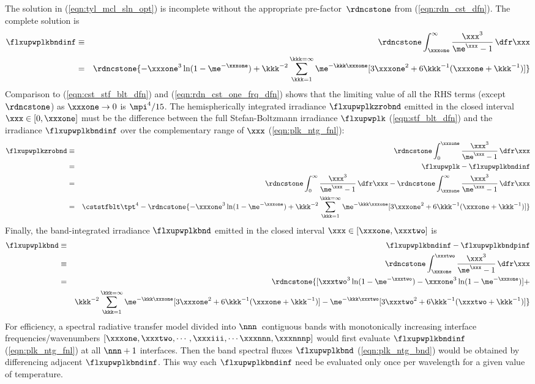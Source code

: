 \documentclass[12pt]{article}
\begin{document}
The solution in (\ref{eqn:tyl_mcl_sln_opt}) is incomplete without the appropriate pre-factor~$\rdncstone$ from (\ref{eqn:rdn_cst_dfn}).
The complete solution is
\begin{eqnarray}
\label{eqn:plk_ntg_fnl}
\flxupwplkbndinf
& \equiv & \rdncstone
\int_{\xxxone}^{\infty} 
\frac{\xxx^{3}}{\me^{\xxx} - 1} \,\dfr\xxx \nonumber \\
& = & \rdncstone \{
-\xxxone^{3}\ln(1 - \me^{-\xxxone}) + 
\kkk^{-2}\sum_{\kkk=1}^{\kkk=\infty} \me^{-\kkk\xxxone}[3\xxxone^{2} + 6\kkk^{-1}(\xxxone + \kkk^{-1})] \}
\end{eqnarray}
Comparison to (\ref{eqn:cst_stf_blt_dfn}) and (\ref{eqn:rdn_cst_one_frq_dfn}) shows that the limiting value of all the RHS terms (except $\rdncstone$) as $\xxxone \rightarrow 0$ is $\mpi^{4}/15$.
The hemispherically integrated irradiance $\flxupwplkzrobnd$ emitted
in the closed interval $\xxx \in [0,\xxxone]$ must be the difference
between the full Stefan-Boltzmann irradiance $\flxupwplk$
(\ref{eqn:stf_blt_dfn}) and the irradiance $\flxupwplkbndinf$ over the
complementary range of $\xxx$ (\ref{eqn:plk_ntg_fnl}): 
\begin{eqnarray}
\label{eqn:plk_ntg_cmp}
\flxupwplkzrobnd
& \equiv & \rdncstone
\int_{0}^{\xxxone} 
\frac{\xxx^{3}}{\me^{\xxx} - 1} \,\dfr\xxx \nonumber \\
& = & \flxupwplk - \flxupwplkbndinf \nonumber \\
& = & \rdncstone
\int_{0}^{\infty} 
\frac{\xxx^{3}}{\me^{\xxx} - 1} \,\dfr\xxx -
\rdncstone
\int_{\xxxone}^{\infty} 
\frac{\xxx^{3}}{\me^{\xxx} - 1} \,\dfr\xxx \nonumber \\
& = & \cststfblt \tpt^{4} - \rdncstone \{
-\xxxone^{3}\ln(1 - \me^{-\xxxone}) + 
\kkk^{-2}\sum_{\kkk=1}^{\kkk=\infty} \me^{-\kkk\xxxone}[3\xxxone^{2} + 6\kkk^{-1}(\xxxone + \kkk^{-1})] \}
\end{eqnarray}
Finally, the band-integrated irradiance $\flxupwplkbnd$ emitted
in the closed interval $\xxx \in [\xxxone,\xxxtwo]$ is
\begin{eqnarray}
\label{eqn:plk_ntg_bnd}
\flxupwplkbnd
& \equiv & \flxupwplkbndinf - \flxupwplkbndpinf \nonumber \\
& \equiv & \rdncstone
\int_{\xxxone}^{\xxxtwo} 
\frac{\xxx^{3}}{\me^{\xxx} - 1} \,\dfr\xxx \nonumber \\
& = & \rdncstone \{
[\xxxtwo^{3}\ln(1 - \me^{-\xxxtwo}) - \xxxone^{3}\ln(1 - \me^{-\xxxone})] + \nonumber \\
& & 
\kkk^{-2}\sum_{\kkk=1}^{\kkk=\infty} \me^{-\kkk\xxxone}[3\xxxone^{2} + 6\kkk^{-1}(\xxxone + \kkk^{-1})] - \me^{-\kkk\xxxtwo}[3\xxxtwo^{2} + 6\kkk^{-1}(\xxxtwo + \kkk^{-1})] \}
\end{eqnarray}
For efficiency, a spectral radiative transfer model divided into $\nnn$~contiguous bands with monotonically increasing interface frequencies/wavenumbers $[\xxxone, \xxxtwo, \cdots, \xxxiii, \cdots \xxxnnn, \xxxnnnp]$ would first evaluate $\flxupwplkbndinf$ (\ref{eqn:plk_ntg_fnl}) at all $\nnn+1$ interfaces.
Then the band spectral fluxes $\flxupwplkbnd$ (\ref{eqn:plk_ntg_bnd}) would be obtained by differencing adjacent $\flxupwplkbndinf$.
This way each $\flxupwplkbndinf$ need be evaluated only once per wavelength for a given value of temperature.
\end{document}
